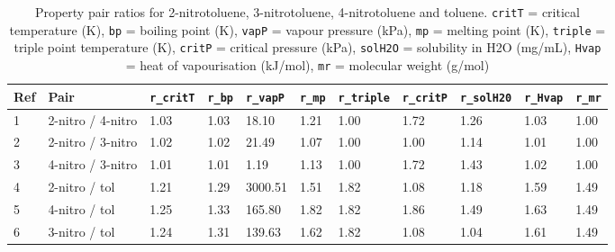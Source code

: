 \begin{landscape}
\begin{table}[H]
\centering
\caption{Property pair ratios for 2-nitrotoluene, 3-nitrotoluene, 4-nitrotoluene and toluene. \texttt{critT} = critical temperature (K), \texttt{bp} = boiling point (K), \texttt{vapP} = vapour pressure (kPa), \texttt{mp} = melting point (K), \texttt{triple} = triple point temperature (K), \texttt{critP} = critical pressure (kPa), \texttt{solH2O} = solubility in H2O (mg/mL), \texttt{Hvap} = heat of vapourisation (kJ/mol), \texttt{mr} = molecular weight (g/mol)}
\label{tab:jaksland}
\begin{tabular}{@{}lllllllllll@{}}
\toprule
Ref & Pair              & \texttt{r\_critT} & \texttt{r\_bp} & \texttt{r\_vapP} & \texttt{r\_mp} & \texttt{r\_triple} & \texttt{r\_critP} & \texttt{r\_solH20} & \texttt{r\_Hvap} & \texttt{r\_mr} \\ \midrule
1   & 2-nitro / 4-nitro & 1.03              & 1.03           & 18.10            & 1.21           & 1.00               & 1.72              & 1.26               & 1.03             & 1.00           \\
2   & 2-nitro / 3-nitro & 1.02              & 1.02           & 21.49            & 1.07           & 1.00               & 1.00              & 1.14               & 1.01             & 1.00           \\
3   & 4-nitro / 3-nitro & 1.01              & 1.01           & 1.19             & 1.13           & 1.00               & 1.72              & 1.43               & 1.02             & 1.00           \\
4   & 2-nitro / tol     & 1.21              & 1.29           & 3000.51          & 1.51           & 1.82               & 1.08              & 1.18               & 1.59             & 1.49           \\
5   & 4-nitro / tol     & 1.25              & 1.33           & 165.80           & 1.82           & 1.82               & 1.86              & 1.49               & 1.63             & 1.49           \\
6   & 3-nitro / tol     & 1.24              & 1.31           & 139.63           & 1.62           & 1.82               & 1.08              & 1.04               & 1.61             & 1.49           \\ \bottomrule
\end{tabular}
\end{table}



\end{landscape}
